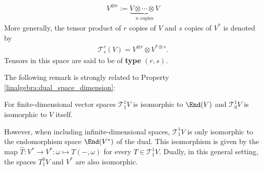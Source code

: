     \begin{notation}\label{vector:type}
        \begin{gather}
            V^{\otimes n} := \underbrace{V\otimes\cdots\otimes V}_{n\text{ copies}}
        \end{gather}
        More generally, the tensor product of $r$ copies of $V$ and $s$ copies of $V^*$ is denoted by
        \begin{gather}
            \mathcal{T}^r_s(V) = V^{\otimes r}\otimes V^{*\otimes s}.
        \end{gather}
        Tensors in this space are said to be of \textbf{type} $(r,s)$.
    \end{notation}

    The following remark is strongly related to Property \ref{linalgebra:dual_space_dimension}:
    \begin{remark}
        For finite-dimensional vector spaces $\mathcal{T}^1_1V$ is isomorphic to $\End(V)$ and $\mathcal{T}^1_0V$ is isomorphic to $V$ itself.

        However, when including infinite-dimensional spaces, $\mathcal{T}^1_1V$ is only isomorphic to the endomorphism space $\End(V^*)$ of the dual. This isomorphism is given by the map $\hat{T}:V^*\rightarrow V^*:\omega\mapsto T(-,\omega)$ for every $T\in\mathcal{T}^1_1V$. Dually, in this general setting, the spaces $T^0_1V$ and $V^*$ are also isomorphic.
    \end{remark}

